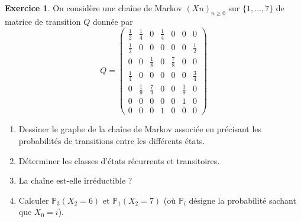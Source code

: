 \documentclass[10pt,fleqn, svgnames]{article}
\theoremstyle{definition}
\newtheorem{exo}{Exercice}
\begin{document}
\begin{exo}
	On considère une chaîne de Markov $(Xn)_{n\geq0}$ sur $\{1, \dots, 7\}$ de matrice de transition $Q$
donnée par
$$Q =
\begin{pmatrix}
\frac12 &\frac14 &0 &\frac14 &0 &0 &0 \\
\frac12 &0 &0 &0 &0 &0 &\frac12\\
0& 0 &\frac18 &0 &\frac78 &0 &0\\
\frac14 &0 &0 &0 &0 &0 &\frac34\\
0 &\frac19 &\frac79 &0 &0 &\frac19 &0\\
0 &0 &0 &0 &0 &1 &0\\
0 &0 &0 &1 &0 &0 &0\end{pmatrix}$$
\begin{enumerate}
\item Dessiner le graphe de la chaîne de Markov associée en précisant les probabilités de transitions
entre les différents états.
\item Déterminer les classes d’états récurrents et transitoires.
\item La chaîne est-elle irréductible ?
\item Calculer $\mathbb P_3(X_2 = 6)$ et $\mathbb P_1(X_2 = 7)$ (où $\mathbb P_i$ désigne la probabilité sachant que $X_0=i$).
\end{enumerate}
\end{exo}
\end{document}
